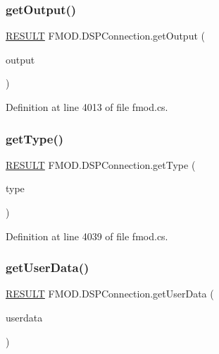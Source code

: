 \subsubsection{\texorpdfstring{get\+Output()}{getOutput()}}
{\footnotesize\ttfamily \hyperlink{namespace_f_m_o_d_a305d1176ef3f8c8815861a60407ac33d}{R\+E\+S\+U\+LT} F\+M\+O\+D.\+D\+S\+P\+Connection.\+get\+Output (\begin{DoxyParamCaption}\item[{out \hyperlink{class_f_m_o_d_1_1_d_s_p}{D\+SP}}]{output }\end{DoxyParamCaption})}



Definition at line 4013 of file fmod.\+cs.

\mbox{\label{class_f_m_o_d_1_1_d_s_p_connection_ae144df4faa02c93a08ac36f34e569581}} 
\subsubsection{\texorpdfstring{get\+Type()}{getType()}}
{\footnotesize\ttfamily \hyperlink{namespace_f_m_o_d_a305d1176ef3f8c8815861a60407ac33d}{R\+E\+S\+U\+LT} F\+M\+O\+D.\+D\+S\+P\+Connection.\+get\+Type (\begin{DoxyParamCaption}\item[{out \hyperlink{namespace_f_m_o_d_abd730a6ff8b969c2f90d4123deb42aca}{D\+S\+P\+C\+O\+N\+N\+E\+C\+T\+I\+O\+N\+\_\+\+T\+Y\+PE}}]{type }\end{DoxyParamCaption})}



Definition at line 4039 of file fmod.\+cs.

\mbox{\label{class_f_m_o_d_1_1_d_s_p_connection_a0ba899f70bf4b962cf3f5fb0d63c6dac}} 
\subsubsection{\texorpdfstring{get\+User\+Data()}{getUserData()}}
{\footnotesize\ttfamily \hyperlink{namespace_f_m_o_d_a305d1176ef3f8c8815861a60407ac33d}{R\+E\+S\+U\+LT} F\+M\+O\+D.\+D\+S\+P\+Connection.\+get\+User\+Data (\begin{DoxyParamCaption}\item[{out Int\+Ptr}]{userdata }\end{DoxyParamCaption})}



